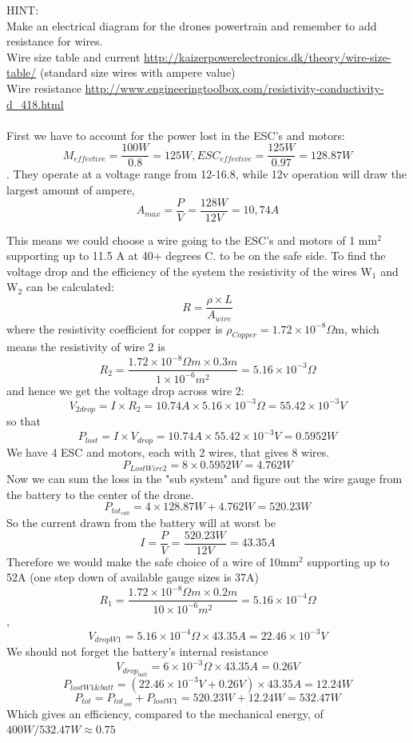 \documentclass[paper=letter, fontsize=10pt]{article}
\begin{document}
HINT:\\
Make an electrical diagram for the drones powertrain and remember to add resistance for wires.\\
Wire size table and current \url{http://kaizerpowerelectronics.dk/theory/wire-size-table/} (standard size wires with ampere value)  \\
Wire resistance \url{http://www.engineeringtoolbox.com/resistivity-conductivity-d_418.html}
\paragraph{}

\newcommand*\SI[1]{\times 10^{#1}}

First we have to account for the power lost in the ESC's and motors: $$M_{effective} =  \frac{100W}{0.8}=125W,   ESC_{effective}=\frac{125W}{0.97}=128.87W$$. They operate at a voltage range from 12-16.8, while 12v operation will draw the largest amount of ampere, $$A_{max}=\frac{P}{V}=\frac{128W}{12V}=10,74A$$ 

This means we could choose a wire going to the ESC's and motors of 1 mm$^2$ supporting up to 11.5 A at 40+ degrees C. to be on the safe side. To find the voltage drop and the efficiency of the system the resistivity of the wires W$_1$ and W$_2$ can be calculated:
$$R=\frac{\rho \times L}{A_{wire}}$$
where the resistivity coefficient for copper is  $\rho_{Copper}=1.72\times 10^{-8} \Omega$m, which means the resistivity of wire 2 is 
$$ R_2=\frac{1.72\times 10^{-8} \Omega m \times 0.3m}{1\times 10^{-6}m^2}=5.16\times 10^{-3}\Omega $$
and hence we get the voltage drop across wire 2:
$$ V_{2drop}=I\times R_2 =10.74A \times 5.16\times 10^{-3}\Omega=55.42\SI{-3}V $$
so that 
$$P_{lost}=I\times V_{drop} = 10.74A\times 55.42\SI{-3}V=0.5952W$$
We have 4 ESC and motors, each with 2 wires, that gives 8 wires. $$P_{LostWire2}=8\times 0.5952W=4.762W$$
Now we can sum the loss in the "sub system" and figure out the wire gauge from the battery to the center of the drone.
$$P_{tot_{sub}}=4\times 128.87W+4.762W=520.23W$$
So the current drawn from the battery will at worst be
$$I=\frac{P}{V}=\frac{520.23W}{12V}=43.35A$$
Therefore we would make the safe choice of a wire of 10mm$^2$ supporting up to 52A (one step down of available gauge sizes is 37A) 
$$R_1= \frac{1.72\times 10^{-8} \Omega m \times 0.2m}{10\times 10^{-6}m^2}=5.16\times 10^{-4}\Omega$$, $$  V_{dropW1}=5.16\times 10^{-4}\Omega \times 43.35A = 22.46\SI{-3}V$$
We should not forget the battery's internal resistance
$$
V_{drop_{batt}}=6\SI{-3}\Omega \times 43.35A = 0.26V
$$
$$ P_{lostW1\&batt}=(22.46\SI{-3}V+0.26V)\times 43.35A=12.24W$$ $$
P_{tot}=P_{tot_{sub}}+P_{lostW1}=520.23W+12.24W=532.47W$$
Which gives an efficiency, compared to the mechanical energy, of $400W/532.47W \approx 0.75$
\end{document}
